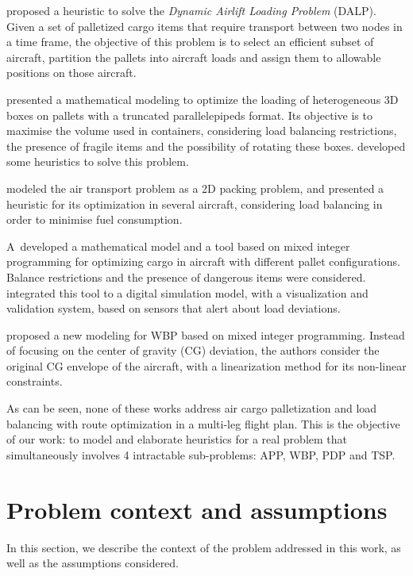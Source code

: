 \documentclass[preprint,authoryear]{elsarticle}
\begin{document}
\cite{RoesenerBarnes2016} proposed a heuristic to solve the {\it Dynamic Airlift Loading Problem} (DALP). Given a set of palletized cargo items that require transport between two nodes in a time frame, the objective of this problem is to select an efficient subset of aircraft, partition the pallets into aircraft loads and assign them to allowable positions on those aircraft.

\cite{PaquaySchynsLimbourg2016} presented a mathematical modeling to optimize the loading of heterogeneous 3D boxes on pallets with a truncated parallelepipeds format. Its objective is to maximise the volume used in containers, considering load balancing restrictions, the presence of fragile items and the possibility of rotating these boxes. \cite{PaquayLimbourgSchynsOliveira2018} developed some heuristics to solve this problem.

\cite{YangLiuGao2018} modeled the air transport problem as a 2D packing problem, and presented a heuristic for its optimization in several aircraft, considering load balancing in order to minimise fuel consumption.

\cite{wong2020}A developed a mathematical model and a tool based on mixed integer programming for optimizing cargo in aircraft with different pallet configurations. Balance restrictions and the presence of dangerous items were considered. \cite{eugene2021} integrated this tool to a digital simulation model, with a visualization and validation system, based on sensors that alert about load deviations.

\cite{zhao2021} proposed a new modeling for WBP based on mixed integer programming. Instead of focusing on the center of gravity (CG) deviation, the authors consider the original CG envelope of the aircraft, with a linearization method for its non-linear constraints.

As can be seen, none of these works address air cargo palletization and load balancing with route optimization in a multi-leg flight plan. This is the objective of our work: to model and elaborate heuristics for a real problem that simultaneously involves 4 intractable sub-problems: APP, WBP, PDP and TSP.


\section{Problem context and assumptions}
\label{sec3}

In this section, we describe the context of the problem addressed in this work, as well as the assumptions considered.
\end{document}
